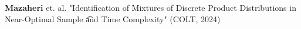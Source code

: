 \documentclass[preview]{standalone}
\begin{document}
\begin{center}
\textbf{Mazaheri} et. al.  "Identification of Mixtures of Discrete Product Distributions in Near-Optimal Sample \n \t and Time Complexity" (COLT, 2024)
\end{center}
\end{document}
